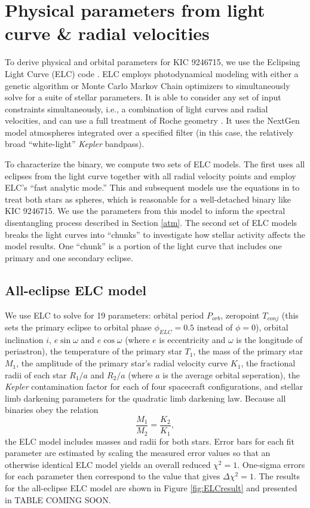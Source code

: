 \section{Physical parameters from light curve \& radial velocities}\label{model}
To derive physical and orbital parameters for KIC 9246715, we use the Eclipsing Light Curve (ELC) code \citep{oro00}. ELC employs photodynamical modeling with either a genetic algorithm or Monte Carlo Markov Chain optimizers to simultaneously solve for a suite of stellar parameters. It is able to consider any set of input constraints simultaneously, i.e., a combination of light curves and radial velocities, and can use a full treatment of Roche geometry \citep{kop69,avn75}. It uses the NextGen model atmospheres integrated over a specified filter (in this case, the relatively broad ``white-light'' \emph{Kepler} bandpass).

To characterize the binary, we compute two sets of ELC models. The first uses all eclipses from the light curve together with all radial velocity points and employ ELC's ``fast analytic mode.'' This and subsequent models use the equations in \citet{man02} to treat both stars as spheres, which is reasonable for a well-detached binary like KIC 9246715. We use the parameters from this model to inform the spectral disentangling process described in Section \ref{atm}. The second set of ELC models breaks the light curves into ``chunks'' to investigate how stellar activity affects the model results. One ``chunk'' is a portion of the light curve that includes one primary and one secondary eclipse.

\subsection{All-eclipse ELC model}

We use ELC to solve for 19 parameters: orbital period $P_{orb}$, zeropoint $T_{conj}$ (this sets the primary eclipse to orbital phase $\phi_{ELC} = 0.5$ instead of $\phi = 0$), orbital inclination $i$, $e \sin \omega$ and $e \cos \omega$ (where $e$ is eccentricity and $\omega$ is the longitude of periastron), the temperature of the primary star $T_1$, the mass of the primary star $M_1$, the amplitude of the primary star's radial velocity curve $K_1$, the fractional radii of each star $R_1/a$ and $R_2/a$ (where $a$ is the average orbital seperation), the \emph{Kepler} contamination factor for each of four spacecraft configurations, and stellar limb darkening parameters for the quadratic limb darkening law. Because all binaries obey the relation
\begin{equation}
\frac{M_1}{M_2} = \frac{K_2}{K_1},
\end{equation}
the ELC model includes masses and radii for both stars. Error bars for each fit parameter are estimated by scaling the measured error values so that an otherwise identical ELC model yields an overall reduced $\chi^2 = 1$. One-sigma errors for each parameter then correspond to the value that gives $\Delta \chi^2 = 1$. The results for the all-eclipse ELC model are shown in Figure \ref{fig:ELCresult} and presented in TABLE COMING SOON.

